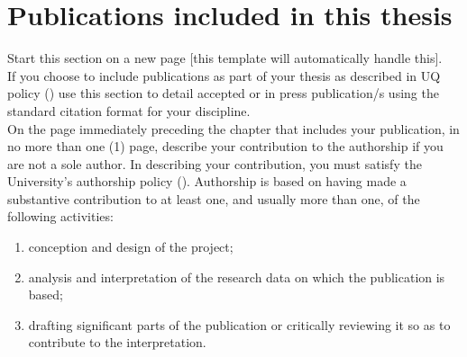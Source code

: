 


\section*{Publications included in this thesis}

\begin{instructional}

	Start this section on a new page [this template will automatically handle this].\\
	
	\noindent
	If you choose to include publications as part of your thesis as described in UQ policy (\href{http://ppl.app.uq.edu.au/content/4.60.07-alternate-thesis-format-options}{\color{blue}{PPL 4.60.07 Alternative Thesis Format Options}}) use this section to detail accepted or in press publication/s using the standard citation format for your discipline. \\
    
    
    \noindent
	On the page immediately preceding the chapter that includes your publication, in no more than one (1) page, describe your contribution to the authorship if you are not a sole author. In describing your contribution, you must satisfy the University's authorship policy (\href{http://ppl.app.uq.edu.au/content/4.20.04-authorship}{\color{blue}{PPL 4.20.04 Authorship}}). Authorship is based on having made a substantive contribution to at least one, and usually more than one, of the following activities:
	\begin{enumerate}
		\item	conception and design of the project;
		\item	analysis and interpretation of the research data on which the publication is based;
		\item	drafting significant parts of the publication or critically reviewing it so as to contribute to the interpretation.
	\end{enumerate}
	

\end{instructional}

